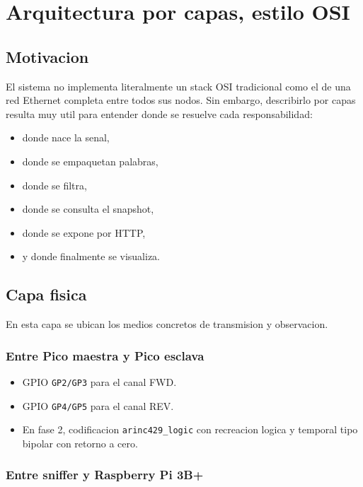 \documentclass[12pt,a4paper]{report}
\begin{document}
\chapter{Arquitectura por capas, estilo OSI}

\section{Motivacion}

El sistema no implementa literalmente un stack OSI tradicional como el de una red Ethernet completa entre todos sus nodos. Sin embargo, describirlo por capas resulta muy util para entender donde se resuelve cada responsabilidad:

\begin{itemize}
    \item donde nace la senal,
    \item donde se empaquetan palabras,
    \item donde se filtra,
    \item donde se consulta el snapshot,
    \item donde se expone por HTTP,
    \item y donde finalmente se visualiza.
\end{itemize}

\section{Capa fisica}

En esta capa se ubican los medios concretos de transmision y observacion.

\subsection*{Entre Pico maestra y Pico esclava}

\begin{itemize}
    \item GPIO \texttt{GP2/GP3} para el canal FWD.
    \item GPIO \texttt{GP4/GP5} para el canal REV.
    \item En fase 2, codificacion \texttt{arinc429\_logic} con recreacion logica y temporal tipo bipolar con retorno a cero.
\end{itemize}

\subsection*{Entre sniffer y Raspberry Pi 3B+}
\end{document}

